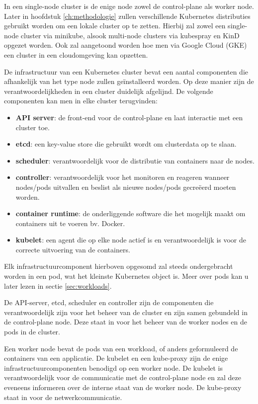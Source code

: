 In een single-node cluster is de enige node zowel de control-plane als worker node.
Later in hoofdstuk \ref{ch:methodologie} zullen verschillende Kubernetes distributies gebruikt worden om een lokale cluster op te zetten. Hierbij zal zowel een single-node cluster via minikube, alsook multi-node clusters via kubespray en KinD opgezet worden. Ook zal aangetoond worden hoe men via Google Cloud (GKE) een cluster in een cloudomgeving kan opzetten.

De infrastructuur van een Kubernetes cluster bevat een aantal componenten die afhankelijk van het type node zullen geïnstalleerd worden. Op deze manier zijn de verantwoordelijkheden in een cluster duidelijk afgelijnd. De volgende componenten kan men in elke cluster terugvinden: 

\begin{itemize}
    \item {\bf API server}: de front-end voor de control-plane en laat interactie met een cluster toe. 
    \item {\bf etcd}: een key-value store die gebruikt wordt om clusterdata op te slaan. 
    \item {\bf scheduler}: verantwoordelijk voor de distributie van containers naar de nodes.
    \item {\bf controller}: verantwoordelijk voor het monitoren en reageren wanneer nodes/pods uitvallen en beslist als nieuwe nodes/pods gecreëerd moeten worden.
    \item {\bf container runtime}: de onderliggende software die het mogelijk maakt om containers uit te voeren bv. Docker. 
    \item {\bf kubelet}: een agent die op elke node actief is en verantwoordelijk is voor de correcte uitvoering van de containers.   
\end{itemize}

Elk infrastructuurcomponent hierboven opgesomd zal steeds ondergebracht worden in een pod, wat het kleinste Kubernetes object is. Meer over pods kan u later lezen in sectie \ref{sec:workloads}.

De API-server, etcd, scheduler en controller zijn de componenten die verantwoordelijk zijn voor het beheer van de cluster en zijn samen gebundeld in de control-plane node. Deze staat in voor het beheer van de worker nodes en de pods in de cluster.

Een worker node bevat de pods van een workload, of anders geformuleerd de containers van een applicatie. De kubelet en een kube-proxy zijn de enige infrastructuurcomponenten benodigd op een worker node. De kubelet is verantwoordelijk voor de communicatie met de control-plane node en zal deze eveneens informeren over de interne staat van de worker node. De kube-proxy staat in voor de netwerkcommunicatie. 

